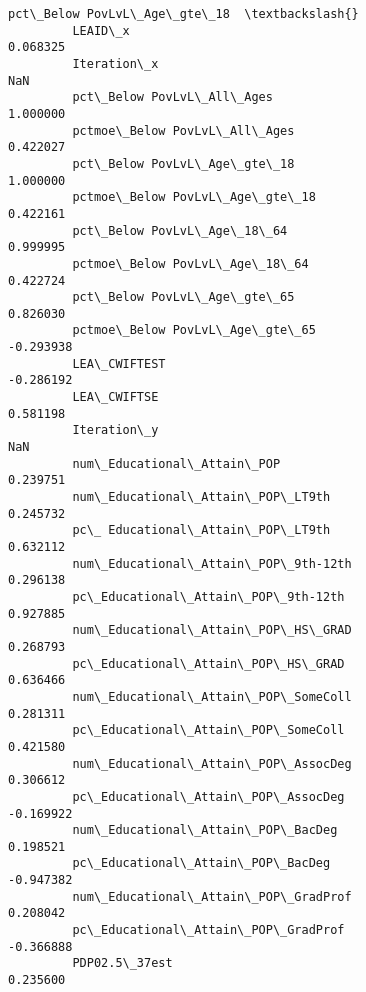 \documentclass[11pt]{article}
\begin{document}
\begin{Verbatim}[commandchars=\\\{\}]
                                                    pct\_Below PovLvL\_Age\_gte\_18  \textbackslash{}
         LEAID\_x                                                       0.068325   
         Iteration\_x                                                        NaN   
         pct\_Below PovLvL\_All\_Ages                                     1.000000   
         pctmoe\_Below PovLvL\_All\_Ages                                  0.422027   
         pct\_Below PovLvL\_Age\_gte\_18                                   1.000000   
         pctmoe\_Below PovLvL\_Age\_gte\_18                                0.422161   
         pct\_Below PovLvL\_Age\_18\_64                                    0.999995   
         pctmoe\_Below PovLvL\_Age\_18\_64                                 0.422724   
         pct\_Below PovLvL\_Age\_gte\_65                                   0.826030   
         pctmoe\_Below PovLvL\_Age\_gte\_65                               -0.293938   
         LEA\_CWIFTEST                                                 -0.286192   
         LEA\_CWIFTSE                                                   0.581198   
         Iteration\_y                                                        NaN   
         num\_Educational\_Attain\_POP                                    0.239751   
         num\_Educational\_Attain\_POP\_LT9th                              0.245732   
         pc\_ Educational\_Attain\_POP\_LT9th                              0.632112   
         num\_Educational\_Attain\_POP\_9th-12th                           0.296138   
         pc\_Educational\_Attain\_POP\_9th-12th                            0.927885   
         num\_Educational\_Attain\_POP\_HS\_GRAD                            0.268793   
         pc\_Educational\_Attain\_POP\_HS\_GRAD                             0.636466   
         num\_Educational\_Attain\_POP\_SomeColl                           0.281311   
         pc\_Educational\_Attain\_POP\_SomeColl                            0.421580   
         num\_Educational\_Attain\_POP\_AssocDeg                           0.306612   
         pc\_Educational\_Attain\_POP\_AssocDeg                           -0.169922   
         num\_Educational\_Attain\_POP\_BacDeg                             0.198521   
         pc\_Educational\_Attain\_POP\_BacDeg                             -0.947382   
         num\_Educational\_Attain\_POP\_GradProf                           0.208042   
         pc\_Educational\_Attain\_POP\_GradProf                           -0.366888   
         PDP02.5\_37est                                                 0.235600   

\end{Verbatim}
\end{document}
